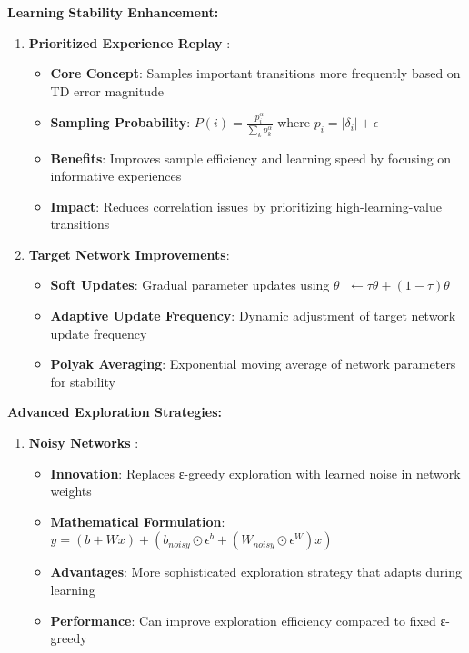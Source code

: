 \documentclass[12pt]{article}
\begin{document}
{{{\textbf{Learning Stability Enhancement:}

\begin{enumerate}
    \item \textbf{Prioritized Experience Replay} \cite{schaul2015prioritized}:
    \begin{itemize}
        \item \textbf{Core Concept}: Samples important transitions more frequently based on TD error magnitude
        \item \textbf{Sampling Probability}: $P(i) = \frac{p_i^\alpha}{\sum_k p_k^\alpha}$ where $p_i = |\delta_i| + \epsilon$
        \item \textbf{Benefits}: Improves sample efficiency and learning speed by focusing on informative experiences
        \item \textbf{Impact}: Reduces correlation issues by prioritizing high-learning-value transitions
    \end{itemize}
    
    \item \textbf{Target Network Improvements}:
    \begin{itemize}
        \item \textbf{Soft Updates}: Gradual parameter updates using $\theta^- \leftarrow \tau \theta + (1-\tau) \theta^-$
        \item \textbf{Adaptive Update Frequency}: Dynamic adjustment of target network update frequency
        \item \textbf{Polyak Averaging}: Exponential moving average of network parameters for stability
    \end{itemize}
\end{enumerate}

\textbf{Advanced Exploration Strategies:}

\begin{enumerate}
    \item \textbf{Noisy Networks} \cite{fortunato2017noisy}:
    \begin{itemize}
        \item \textbf{Innovation}: Replaces ε-greedy exploration with learned noise in network weights
        \item \textbf{Mathematical Formulation}: $y = (b + Wx) + (b_{noisy} \odot \epsilon^b + (W_{noisy} \odot \epsilon^W) x)$
        \item \textbf{Advantages}: More sophisticated exploration strategy that adapts during learning
        \item \textbf{Performance}: Can improve exploration efficiency compared to fixed ε-greedy
    \end{itemize}
    

\end{enumerate}}}}
\end{document}
